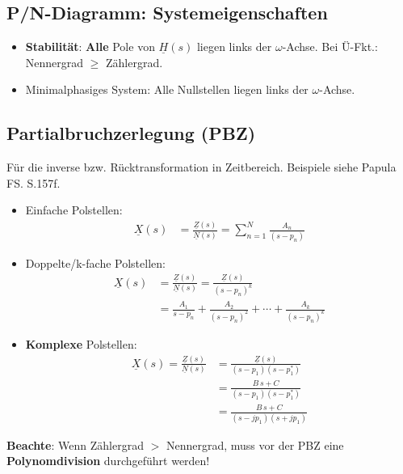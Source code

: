 \subsection{P/N-Diagramm: Systemeigenschaften}
\begin{itemize}
	\item \textbf{Stabilität}: \textbf{Alle} Pole von $\underline{H}(s)$ liegen links der $\omega$-Achse. Bei Ü-Fkt.:  Nennergrad $\ge$ Zählergrad.
	\item Minimalphasiges System: Alle Nullstellen liegen links der $\omega$-Achse.
\end{itemize}
\subsection{Partialbruchzerlegung (PBZ)}
Für die inverse bzw. Rücktransformation in Zeitbereich. Beispiele siehe Papula FS. S.157f.
\begin{itemize}
	\item Einfache Polstellen:
		\begin{align*}
		\underline{X}(s) &= \frac{\underline{Z}(s)}{\underline{N}(s)} = \sum_{n=1}^{N} \frac{A_n}{(s - p_n)}
	\end{align*}
	\item Doppelte/k-fache Polstellen:
	\begin{align*}
			\underline{X}(s) &= \frac{\underline{Z}(s)}{\underline{N}(s)} = \frac{\underline{Z}(s)}{(s - p_n)^k} \\
			&= \frac{A_1}{s - p_{n}} + \frac{A_2}{(s - p_{n})^2} + \cdots + \frac{A_k}{(s - p_{n})^k}
	\end{align*}
	\item \textbf{Komplexe} Polstellen:
		\begin{align*}
		\underline{X}(s) = \frac{\underline{Z}(s)}{\underline{N}(s)} 
		&= \frac{\underline{Z}(s)}{(s -p_{1})(s - p_{1}^*)}\\
		&= \frac{B \, s+C}{(s -p_{1})(s - p_{1}^*)}\\ &= \frac{B \, s+C}{(s -jp_{1})(s +jp_{1})}
	\end{align*}
\end{itemize}
\small \textbf{Beachte}: Wenn Zählergrad $>$ Nennergrad, muss vor der PBZ eine \textbf{Polynomdivision} durchgeführt werden!
\normalsize
